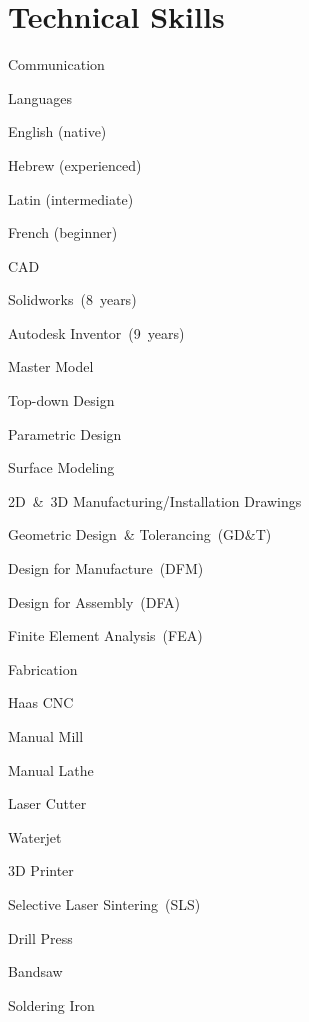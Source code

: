 \documentclass{resume}
\begin{document}
\section{Technical Skills}
\begin{skills}{Communication}
  \item [Languages]
    \begin{commalist}
      \item English (native)
      \item Hebrew (experienced)
      \item Latin (intermediate)
      \item French (beginner)
    \end{commalist}
  \item [CAD]
    \begin{commalist}
      \item Solidworks~(8~years)
      \item Autodesk Inventor~(9~years)
      \item Master Model
      \item Top-down Design
      \item Parametric Design
      \item Surface Modeling
      \item 2D~\&~3D Manufacturing/Installation Drawings
      \item Geometric Design~\& Tolerancing~(GD\&T)
      \item Design for Manufacture~(DFM)
      \item Design for Assembly~(DFA)
      \item Finite Element Analysis~(FEA)
    \end{commalist}
  \item [Fabrication]
    \begin{commalist}
      \item Haas CNC
      \item Manual Mill
      \item Manual Lathe
      \item Laser Cutter
      \item Waterjet
      \item 3D Printer
      \item Selective Laser Sintering~(SLS)
      \item Drill Press
      \item Bandsaw
      \item Soldering Iron

\end{commalist}
\end{skills}
\end{document}
